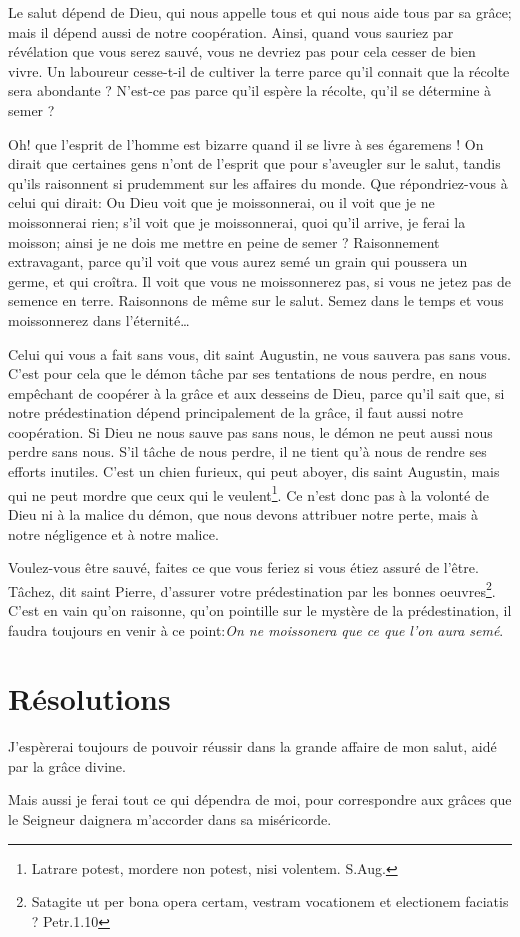 \documentclass[instructions.tex]{subfiles}
\begin{document}
\secundo Le salut dépend de Dieu, qui nous appelle tous et qui nous aide tous par sa grâce; mais il dépend aussi de notre coopération. Ainsi, quand vous sauriez par révélation que vous serez sauvé, vous ne devriez pas pour cela cesser de bien vivre. Un laboureur cesse-t-il de cultiver la terre parce qu'il connait que la récolte sera abondante ? N'est-ce pas parce qu'il espère la récolte, qu'il se détermine à semer ? 

Oh! que l'esprit de l'homme est bizarre quand il se livre à ses égaremens ! On dirait que certaines gens n'ont de l'esprit que pour s'aveugler sur le salut, tandis qu'ils raisonnent si prudemment sur les affaires du monde. Que répondriez-vous à celui qui dirait: Ou Dieu voit que je moissonnerai, ou il voit que je ne moissonnerai rien; s'il voit que je moissonnerai, quoi qu'il arrive, je ferai la moisson; ainsi je ne dois me mettre en peine de semer ? Raisonnement extravagant, parce qu'il voit que vous aurez semé un grain qui poussera un germe, et qui croîtra. Il voit que vous ne moissonnerez pas, si vous ne jetez pas de semence en terre. Raisonnons de même sur le salut. Semez dans le temps et vous moissonnerez dans l'éternité\dots

\og Celui qui vous a fait sans vous\fg, dit saint Augustin, \og ne vous sauvera pas sans vous\fg. C'est pour cela que le démon tâche par ses tentations de nous perdre, en nous empêchant de coopérer à la grâce et aux desseins de Dieu, parce qu'il sait que, si notre prédestination dépend principalement de la grâce, il faut aussi notre coopération. Si Dieu ne nous sauve pas sans nous, le démon ne peut aussi nous perdre sans nous. S'il tâche de nous perdre, il ne tient qu'à nous de rendre ses efforts inutiles. C'est un chien furieux, qui peut aboyer, dis saint Augustin, mais qui ne peut mordre que ceux qui le veulent\footnote{Latrare potest, mordere non potest, nisi volentem. S.Aug.}. Ce n'est donc pas à la volonté de Dieu ni à la malice du démon, que nous devons attribuer notre perte, mais à notre négligence et à notre malice. 

Voulez-vous être sauvé, faites ce que vous feriez si vous étiez assuré de l'être. Tâchez, dit saint Pierre, d'assurer votre prédestination par les bonnes oeuvres\footnote{Satagite ut per bona opera certam, vestram vocationem et electionem faciatis ? Petr.1.10}. C'est en vain qu'on raisonne, qu'on pointille sur le mystère de la prédestination, il faudra toujours en venir à ce point:\textit{On ne moissonera que ce que l'on aura semé}. 

\section{Résolutions}

\primo J'espèrerai toujours de pouvoir réussir dans la grande affaire de mon salut, aidé par la grâce divine. 

\secundo Mais aussi je ferai tout ce qui dépendra de moi, pour correspondre aux grâces que le Seigneur daignera m'accorder dans sa miséricorde.

\end{document}
